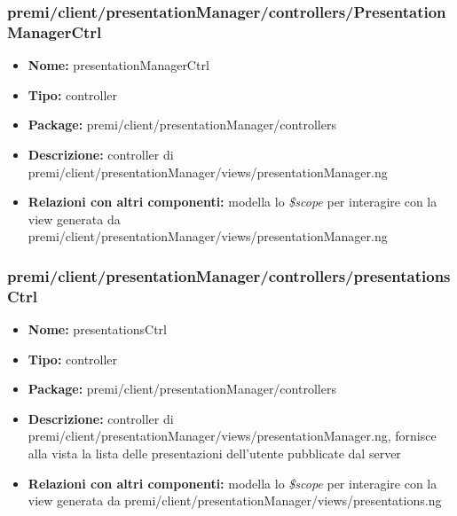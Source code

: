 \subsubsection{premi/client/presentationManager/controllers/PresentationManagerCtrl}
\begin{itemize}
  \item[] \textbf{Nome:} presentationManagerCtrl
  \item[] \textbf{Tipo:} controller
  \item[] \textbf{Package:} premi/client/presentationManager/controllers
  \item[] \textbf{Descrizione:}  controller di premi/client/presentationManager/views/presentationManager.ng
  \item[] \textbf{Relazioni con altri componenti:} modella lo \textit{\$scope} per interagire con la view generata da premi/client/presentationManager/views/presentationManager.ng
\end{itemize}

\subsubsection{premi/client/presentationManager/controllers/presentationsCtrl}
\begin{itemize}
  \item[] \textbf{Nome:} presentationsCtrl
  \item[] \textbf{Tipo:} controller
  \item[] \textbf{Package:} premi/client/presentationManager/controllers
  \item[] \textbf{Descrizione:} controller di premi/client/presentationManager/views/presentationManager.ng, fornisce alla vista la lista delle presentazioni dell'utente pubblicate dal server
  \item[] \textbf{Relazioni con altri componenti:} modella lo \textit{\$scope} per interagire con la view generata da premi/client/presentationManager/views/presentations.ng
\end{itemize}


